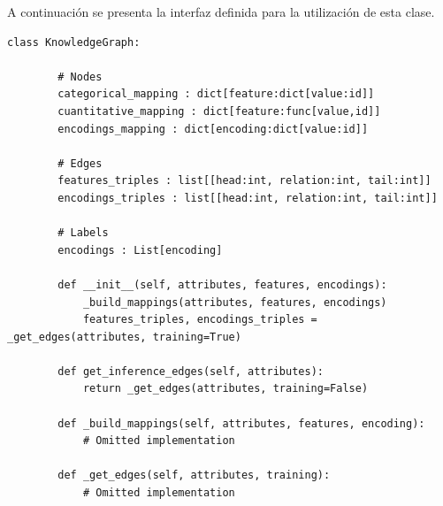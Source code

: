 A continuaci\'on se presenta la interfaz definida para la utilizaci\'on de esta clase.
\begin{lstlisting}[caption= Interfaz de la clase \texttt{KnowledgeGraph}, label = code:graph-generator]
    class KnowledgeGraph:

        # Nodes
        categorical_mapping : dict[feature:dict[value:id]]
        cuantitative_mapping : dict[feature:func[value,id]]
        encodings_mapping : dict[encoding:dict[value:id]]

        # Edges
        features_triples : list[[head:int, relation:int, tail:int]]
        encodings_triples : list[[head:int, relation:int, tail:int]]

        # Labels
        encodings : List[encoding]

        def __init__(self, attributes, features, encodings):
            _build_mappings(attributes, features, encodings)
            features_triples, encodings_triples = _get_edges(attributes, training=True)

        def get_inference_edges(self, attributes):
            return _get_edges(attributes, training=False)

        def _build_mappings(self, attributes, features, encoding):
            # Omitted implementation

        def _get_edges(self, attributes, training):
            # Omitted implementation
\end{lstlisting}






